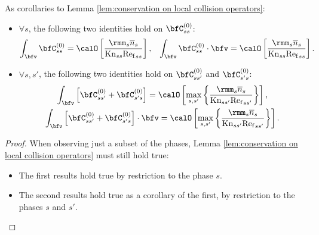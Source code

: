     \begin{corollary}\label{cor:phase-restricted conservation on local collision operators}
        As corollaries to Lemma \ref{lem:conservation on local collision operators}:
        \begin{itemize}
            \item  $\forall s$, the following two identities hold on $\bfC_{ss}^{(0)}$:
            \begin{align}
                \int_{\bfv}\bfC_{ss}^{(0)}           =  \calO\left[\frac{\rmm_{s}\overline{n}_{s}}{\rmKn_{ss}{\rmRef}_{ss}}\right],  &&
                \int_{\bfv}\bfC_{ss}^{(0)}\cdot\bfv  =  \calO\left[\frac{\rmm_{s}\overline{n}_{s}}{\rmKn_{ss}{\rmRef}_{ss}}\right].
            \end{align}
            \item  $\forall s, s'$, the following two identities hold on $\bfC_{ss'}^{(0)}$ and $\bfC_{s's}^{(0)}$:
            \begin{multline}
                \int_{\bfv}\left[\bfC_{ss'}^{(0)} + \bfC_{s's}^{(0)}\right]           =  \calO\left[\max_{s, s'}\left\{\frac{\rmm_{s}\overline{n}_{s}}{\rmKn_{ss'}{\rmRef}_{ss'}}\right\}\right],  \\
                \int_{\bfv}\left[\bfC_{ss'}^{(0)} + \bfC_{s's}^{(0)}\right]\cdot\bfv  =  \calO\left[\max_{s, s'}\left\{\frac{\rmm_{s}\overline{n}_{s}}{\rmKn_{ss'}{\rmRef}_{ss'}}\right\}\right].
            \end{multline}
        \end{itemize}
    \end{corollary}
    \begin{proof}
        When observing just a subset of the phases, Lemma \ref{lem:conservation on local collision operators} must still hold true:
        \begin{itemize}
            \item  The first results hold true by restriction to the phase $s$.
            \item  The second results hold true as a corollary of the first, by restriction to the phases $s$ and $s'$.
        \end{itemize}
    \end{proof}
